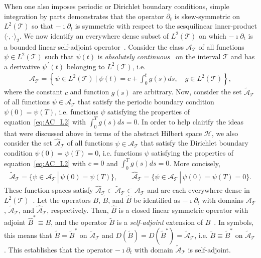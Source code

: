 \documentclass[leqno,onefignum,onetabnum]{siamltex1213}
\newcommand{\Tc}{\mathcal{T}}
\newcommand{\Hs}{\mathscr{H}}
\newcommand{\As}{\mathscr{A}}
\begin{document}
When one also imposes periodic or Dirichlet boundary conditions,
simple integration by parts demonstrates that the operator $\partial_t$ is
skew-symmetric on $L^2(\Tc)$ so that $-\imath\partial_t$ is symmetric with respect
to the sesquilinear inner-product $\langle\cdot,\cdot\rangle_2$. We now identify an
everywhere dense subset of $L^2(\Tc)$ on which $-\imath\partial_t$ is a bounded
linear self-adjoint operator~\cite{Reed-1980,Stone:64}. Consider the
class $\As_{\Tc}$ of all functions $\psi\in L^2(\Tc)$ such that $\psi(t)$ is
\emph{absolutely continuous}~\cite{Royden:1988:RA} on the interval
$\Tc$ and has a derivative $\psi^{\,\prime}(t)$ belonging to $L^2(\Tc)$,
i.e.~\cite{Stone:64,Royden:1988:RA}     
%
\begin{align}\label{eq:AC_L2}
  \As_{\Tc}=
     \left\{
       \psi\in L^2(\Tc) \ \Big| \ \psi(t)=c+\int_0^tg(s)ds,
       \quad  g\in L^2(\Tc)
     \right\},
\end{align}
%
where the constant $c$ and function $g(s)$ are
arbitrary. Now, consider the set $\tilde{\As}_{\Tc}$ of all
functions $\psi\in\As_{\Tc}$ that satisfy the periodic boundary condition
$\psi(0)=\psi(T)$, i.e. functions $\psi$ satisfying the properties of 
equation~\eqref{eq:AC_L2} with $\int_0^Tg(s)ds=0$. In order to help
clairify the ideas that were discussed above in terms of the abstract
Hilbert space $\Hs$, we also consider the set $\hat{\As}_{\Tc}$ of all
functions $\psi\in\As_{\Tc}$ that satisfy the Dirichlet boundary condition
$\psi(0)=\psi(T)=0$, i.e. functions $\psi$ satisfying the properties of
equation~\eqref{eq:AC_L2} with $c=0$ and $\int_0^Tg(s)ds=0$. More
concisely,  
%
\begin{align}\label{eq:AC_BC}
  \tilde{\As}_{\Tc}=\{\psi\in\As_{\Tc} \,|\, \psi(0)=\psi(T)\}, \qquad
  \hat{\As}_{\Tc}=\{\psi\in\As_{\Tc} \,|\, \psi(0)=\psi(T)=0\}.
\end{align}
%
These function spaces satisfy
$\hat{\As}_{\Tc}\subset\tilde{\As}_{\Tc}\subset\As_{\Tc}$ and are each everywhere
dense in $L^2(\Tc)$~\cite{Stone:64}. Let the operators $B$,
$\tilde{B}$, and $\hat{B}$ be identified as $-\imath\partial_t$ with domains
$\As_{\Tc}$, $\tilde{\As}_{\Tc}$, and $\hat{\As}_{\Tc}$,
respectively. Then, $\hat{B}$ is a closed linear symmetric operator
with adjoint $\hat{B}^*\equiv B$, and the operator $\tilde{B}$ is a
\emph{self-adjoint} extension of $\hat{B}$~\cite{Stone:64}. In
symbols, this means that $\tilde{B}=\tilde{B}^*$ on
$\tilde{\As}_{\Tc}$ and
$D(\tilde{B})=D(\tilde{B}^*)=\tilde{\As}_{\Tc}$,
i.e. $\tilde{B}\equiv\tilde{B}^*$ on $\tilde{\As}_{\Tc}$. This establishes
that the operator $-\imath\partial_t$ with domain $\tilde{\As}_{\Tc}$ is
self-adjoint.
\end{document}

